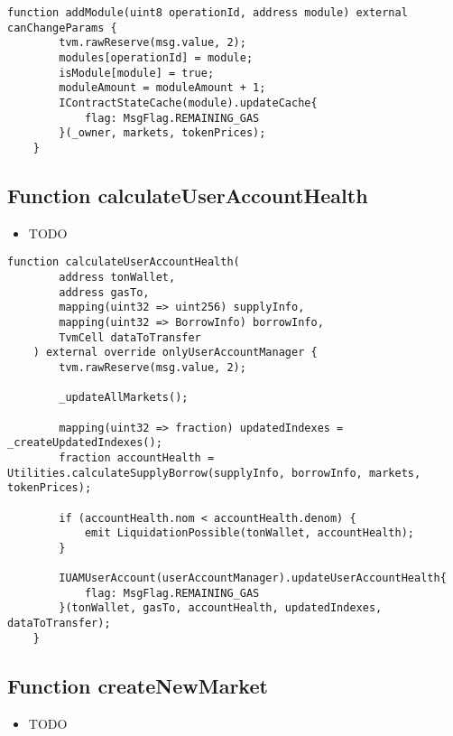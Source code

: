 \begin{lstlisting}[firstnumber=332]
    function addModule(uint8 operationId, address module) external canChangeParams {
        tvm.rawReserve(msg.value, 2);
        modules[operationId] = module;
        isModule[module] = true;
        moduleAmount = moduleAmount + 1;
        IContractStateCache(module).updateCache{
            flag: MsgFlag.REMAINING_GAS
        }(_owner, markets, tokenPrices);
    }
\end{lstlisting}

\subsection{Function calculateUserAccountHealth}

\noindent\begin{itemize}
\item TODO
\end{itemize}

\begin{lstlisting}[firstnumber=376]
    function calculateUserAccountHealth(
        address tonWallet, 
        address gasTo, 
        mapping(uint32 => uint256) supplyInfo, 
        mapping(uint32 => BorrowInfo) borrowInfo, 
        TvmCell dataToTransfer
    ) external override onlyUserAccountManager {
        tvm.rawReserve(msg.value, 2);

        _updateAllMarkets();

        mapping(uint32 => fraction) updatedIndexes = _createUpdatedIndexes();
        fraction accountHealth = Utilities.calculateSupplyBorrow(supplyInfo, borrowInfo, markets, tokenPrices);

        if (accountHealth.nom < accountHealth.denom) {
            emit LiquidationPossible(tonWallet, accountHealth);
        }

        IUAMUserAccount(userAccountManager).updateUserAccountHealth{
            flag: MsgFlag.REMAINING_GAS
        }(tonWallet, gasTo, accountHealth, updatedIndexes, dataToTransfer);
    }
\end{lstlisting}

\subsection{Function createNewMarket}

\noindent\begin{itemize}
\item TODO
\end{itemize}

